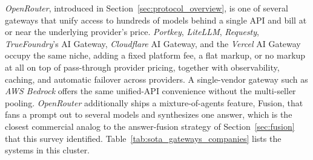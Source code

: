 \emph{OpenRouter}, introduced in Section~\ref{sec:protocol_overview}, is one of
several gateways that unify access to hundreds of models behind a single
API and bill at or near the underlying provider's price. \emph{Portkey},
\emph{LiteLLM}, \emph{Requesty}, \emph{TrueFoundry}'s AI Gateway, \emph{Cloudflare}
AI Gateway, and the \emph{Vercel} AI Gateway occupy the same niche, adding a
fixed platform fee, a flat markup, or no markup at all on top of
pass-through provider pricing, together with observability, caching, and
automatic failover across providers. A single-vendor gateway such as
\emph{AWS Bedrock} offers the same unified-API convenience without the
multi-seller pooling. \emph{OpenRouter} additionally ships a
mixture-of-agents feature, Fusion, that fans a prompt out to several
models and synthesizes one answer, which is the closest commercial
analog to the answer-fusion strategy of Section~\ref{sec:fusion} that
this survey identified.
Table~\ref{tab:sota_gateways_companies} lists the systems in this cluster.

